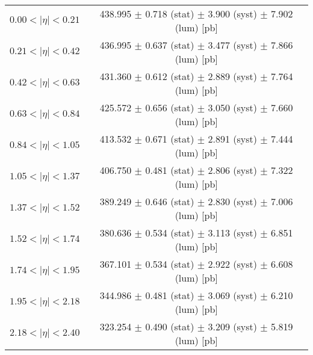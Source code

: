 \begin{tabular}{lc}
\hline
$0.00 < |\eta| <0.21$          & 438.995 $\pm$ 0.718 (stat) $\pm$ 3.900 (syst) $\pm$ 7.902 (lum) [pb]  \\
$0.21 < |\eta| <0.42$          & 436.995 $\pm$ 0.637 (stat) $\pm$ 3.477 (syst) $\pm$ 7.866 (lum) [pb]  \\
$0.42 < |\eta| <0.63$          & 431.360 $\pm$ 0.612 (stat) $\pm$ 2.889 (syst) $\pm$ 7.764 (lum) [pb]  \\
$0.63 < |\eta| <0.84$          & 425.572 $\pm$ 0.656 (stat) $\pm$ 3.050 (syst) $\pm$ 7.660 (lum) [pb]  \\
$0.84 < |\eta| <1.05$          & 413.532 $\pm$ 0.671 (stat) $\pm$ 2.891 (syst) $\pm$ 7.444 (lum) [pb]  \\
$1.05 < |\eta| <1.37$          & 406.750 $\pm$ 0.481 (stat) $\pm$ 2.806 (syst) $\pm$ 7.322 (lum) [pb]  \\
$1.37 < |\eta| <1.52$          & 389.249 $\pm$ 0.646 (stat) $\pm$ 2.830 (syst) $\pm$ 7.006 (lum) [pb]  \\
$1.52 < |\eta| <1.74$          & 380.636 $\pm$ 0.534 (stat) $\pm$ 3.113 (syst) $\pm$ 6.851 (lum) [pb]  \\
$1.74 < |\eta| <1.95$          & 367.101 $\pm$ 0.534 (stat) $\pm$ 2.922 (syst) $\pm$ 6.608 (lum) [pb]  \\
$1.95 < |\eta| <2.18$          & 344.986 $\pm$ 0.481 (stat) $\pm$ 3.069 (syst) $\pm$ 6.210 (lum) [pb]  \\
$2.18 < |\eta| <2.40$          & 323.254 $\pm$ 0.490 (stat) $\pm$ 3.209 (syst) $\pm$ 5.819 (lum) [pb]  \\
\hline
\end{tabular}
